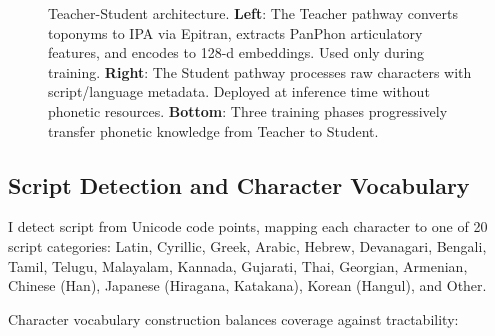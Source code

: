 \documentclass[11pt,a4paper]{article}
\begin{document}
\begin{figure}[ht]
\caption{Teacher-Student architecture. \textbf{Left}: The Teacher pathway converts toponyms to IPA via Epitran, extracts PanPhon articulatory features, and encodes to 128-d embeddings. Used only during training. \textbf{Right}: The Student pathway processes raw characters with script/language metadata. Deployed at inference time without phonetic resources. \textbf{Bottom}: Three training phases progressively transfer phonetic knowledge from Teacher to Student.}
\label{fig:architecture}
\end{figure}

\subsection{Script Detection and Character Vocabulary}

I detect script from Unicode code points, mapping each character to one of 20 script categories: Latin, Cyrillic, Greek, Arabic, Hebrew, Devanagari, Bengali, Tamil, Telugu, Malayalam, Kannada, Gujarati, Thai, Georgian, Armenian, Chinese (Han), Japanese (Hiragana, Katakana), Korean (Hangul), and Other.

Character vocabulary construction balances coverage against tractability:
\end{document}
